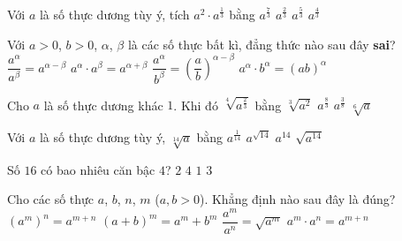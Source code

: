 \begin{ex}%
	 Với $a$ là số thực dương tùy ý, tích $a^2\cdot a^{\tfrac{1}{3}}$ bằng
	 \choice
		{\True $a^{\tfrac{7}{3}}$} 
		{$a^{\tfrac{2}{3}}$} 
		{$a^{\tfrac{5}{3}}$} 
		 {$a^{\tfrac{4}{3}}$}
\end{ex}

\begin{ex}%
	Với $a > 0$, $b > 0$, $\alpha$, $\beta$ là các số thực bất kì, đẳng thức nào sau  đây {\bf{sai}}?
	 \choice
		{$\dfrac{a^{\alpha}}{a^{\beta}}=a^{\alpha-\beta}$} 
		{$a^{\alpha}\cdot  a^{\beta}=a^{\alpha+\beta}$}
		 {\True $\dfrac{a^{\alpha}}{b^{\beta}}=\left(\dfrac{a}{b}\right)^{\alpha-\beta}$}
		{$a^{\alpha}\cdot b^{\alpha}=(ab)^{\alpha}$} 
\end{ex}

\begin{ex}%
	Cho $a$ là số thực dương khác $1$. Khi đó  $\sqrt[4]{a^{\tfrac{2}{3}}}$ bằng
	\choice 
		{$\sqrt[{3}]{a^2}$} 
		 {$a^{\tfrac{8}{3}}$}
		 {$a^{\tfrac{3}{8}}$}
		{\True $\sqrt[{6}]{a}$} 
\end{ex}

\begin{ex}%
	Với $a$  là số thực dương tùy ý, $\sqrt[14]{a}$ bằng
	\choice 
		 {\True $a^{\tfrac{1}{14}}$}
		{$a^{\sqrt{14}}$} 
		{$a^{14}$} 
		{$\sqrt{a^{14}}$} 
\end{ex}

\begin{ex}%
	Số $16$ có bao nhiêu căn bậc $4$? 
	\choice 
		 {\True $2$}
		 {$4$}
		{$1$} 
		{$3$} 
\end{ex}

\begin{ex}%
	Cho các số thực $a$, $b$, $n$, $m$  ($a,b>0$). Khẳng định nào sau đây là đúng?
	\choice 
		{$\left( a^m\right)^n=a^{m+n} $} 
		{$(a+b)^m=a^m+b^m$} 
		 {$\dfrac{a^m}{a^n}=\sqrt{a^m}$}
		{\True  $a^m\cdot a^n=a^{m+n}$}
\end{ex}

